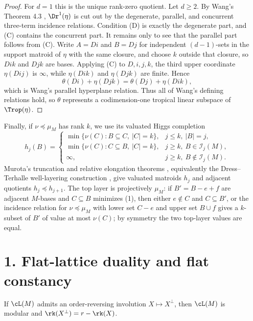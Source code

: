 \begin{proof}
For $d=1$ this is the unique rank-zero quotient.  Let $d\ge2$.  By
Wang's Theorem 4.3 \cite{Wang}, $\Dr^1(\eta)$ is cut out by the
degenerate, parallel, and concurrent three-term incidence relations.
Condition (D) is exactly the degenerate part, and (C) contains the
concurrent part.  It remains only to see that the parallel part follows
from (C).  Write $A=Di$ and $B=Dj$ for independent $(d-1)$-sets in the
support matroid of $\eta$ with the same closure, and choose $k$ outside
that closure, so $Dik$ and $Djk$ are bases.  Applying (C) to
$D,i,j,k$, the third upper coordinate $\eta(Dij)$ is $\infty$, while
$\eta(Dik)$ and $\eta(Djk)$ are finite.  Hence
\[
        \theta(Di)+\eta(Djk)=\theta(Dj)+\eta(Dik),
\]
which is Wang's parallel hyperplane relation.  Thus all of Wang's
defining relations hold, so $\theta$ represents a codimension-one
tropical linear subspace of $\Trop(\eta)$.
\end{proof}

Finally, if $\nu\preceq\mu_M$ has rank $k$, we use its valuated Higgs
completion
\[
 h_j(B)=
 \begin{cases}
 \min\{\nu(C): B\subseteq C,\ |C|=k\}, & j\le k,\ |B|=j,\\
 \min\{\nu(C): C\subseteq B,\ |C|=k\}, & j\ge k,\ B\in\mathcal I_j(M),\\
 \infty, & j\ge k,\ B\notin\mathcal I_j(M).
 \end{cases}                                                \tag{1}
\]
Murota's truncation and relative elongation theorems \cite[Theorems 2.1 and 4.1]{Murota}, equivalently the
Dress--Terhalle well-layering construction \cite{DT}, give valuated matroids
$h_j$ and adjacent quotients $h_j\preceq h_{j+1}$.  The top layer is
projectively $\mu_M$: if $B'=B-e+f$ are adjacent $M$-bases and
$C\subseteq B$ minimizes (1), then either $e\notin C$ and $C\subseteq B'$,
or the incidence relation for $\nu\preceq\mu_M$ with lower set $C-e$ and
upper set $B\cup f$ gives a $k$-subset of $B'$ of value at most
$\nu(C)$; by symmetry the two top-layer values are equal.

\section*{1. Flat-lattice duality and flat constancy}

\begin{lemma}\label{lem:modular}
If $\cL(M)$ admits an order-reversing involution $X\mapsto X^\perp$,
then $\cL(M)$ is modular and $\rk(X^\perp)=r-\rk(X)$.
\end{lemma}

